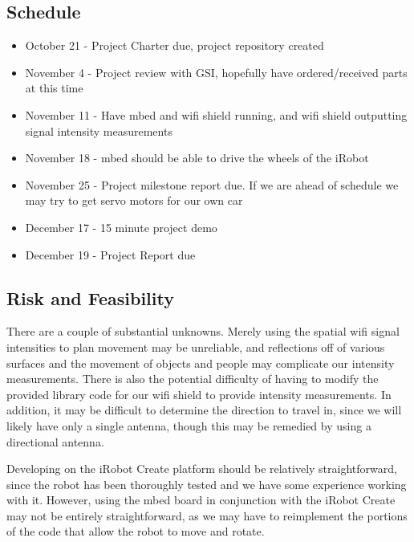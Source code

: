 \documentclass[letterpaper]{article}
\begin{document}
\subsection*{Schedule}

\begin{itemize}
\item October 21 - Project Charter due, project repository created
\item November 4 - Project review with GSI, hopefully have ordered/received parts at this time
\item November 11 - Have mbed and wifi shield running, and wifi shield outputting signal intensity measurements
\item November 18 - mbed should be able to drive the wheels of the iRobot
\item November 25 - Project milestone report due. If we are ahead of schedule we may try to get servo motors for our own car
\item December 17 - 15 minute project demo
\item December 19 - Project Report due
\end{itemize}

\subsection*{Risk and Feasibility}

There are a couple of substantial unknowns. Merely using the spatial wifi signal intensities to plan movement may be unreliable, and reflections off of various surfaces and the movement of objects and people may complicate our intensity measurements. There is also the potential difficulty of having to modify the provided library code for our wifi shield to provide intensity measurements. In addition, it may be difficult to determine the direction to travel in, since we will likely have only a single antenna, though this may be remedied by using a directional antenna.

Developing on the iRobot Create platform should be relatively straightforward, since the robot has been thoroughly tested and we have some experience working with it. However, using the mbed board in conjunction with the iRobot Create may not be entirely straightforward, as we may have to reimplement the portions of the code that allow the robot to move and rotate.
\end{document}
